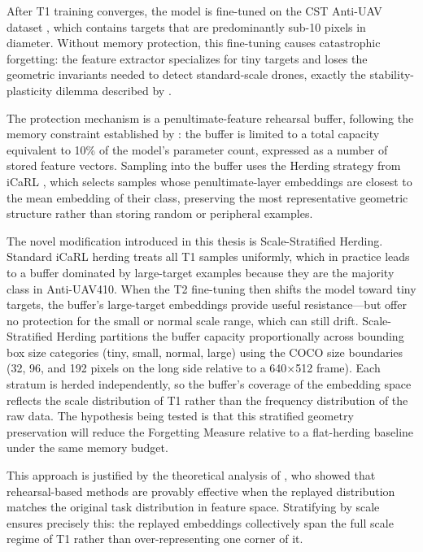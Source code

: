 \documentclass[nolinenumbering]{thesisdesign}
\begin{document}
After T1 training converges, the model is fine-tuned on the CST Anti-UAV dataset \citep{xie2025cstantiuavthermalinfrared}, which contains targets that are predominantly sub-10 pixels in diameter. Without memory protection, this fine-tuning causes catastrophic forgetting: the feature extractor specializes for tiny targets and loses the geometric invariants needed to detect standard-scale drones, exactly the stability-plasticity dilemma described by \citet{deng_unlocking_2025}.

The protection mechanism is a penultimate-feature rehearsal buffer, following the memory constraint established by \citet{chaudhry2019tiny}: the buffer is limited to a total capacity equivalent to 10\% of the model's parameter count, expressed as a number of stored feature vectors. Sampling into the buffer uses the Herding strategy from iCaRL \citep{rebuffi2017icarl}, which selects samples whose penultimate-layer embeddings are closest to the mean embedding of their class, preserving the most representative geometric structure rather than storing random or peripheral examples.

The novel modification introduced in this thesis is Scale-Stratified Herding. Standard iCaRL herding treats all T1 samples uniformly, which in practice leads to a buffer dominated by large-target examples because they are the majority class in Anti-UAV410. When the T2 fine-tuning then shifts the model toward tiny targets, the buffer's large-target embeddings provide useful resistance---but offer no protection for the small or normal scale range, which can still drift. Scale-Stratified Herding partitions the buffer capacity proportionally across bounding box size categories (tiny, small, normal, large) using the COCO size boundaries (32, 96, and 192 pixels on the long side relative to a 640$\times$512 frame). Each stratum is herded independently, so the buffer's coverage of the embedding space reflects the scale distribution of T1 rather than the frequency distribution of the raw data. The hypothesis being tested is that this stratified geometry preservation will reduce the Forgetting Measure relative to a flat-herding baseline under the same memory budget.

This approach is justified by the theoretical analysis of \citet{deng_unlocking_2025}, who showed that rehearsal-based methods are provably effective when the replayed distribution matches the original task distribution in feature space. Stratifying by scale ensures precisely this: the replayed embeddings collectively span the full scale regime of T1 rather than over-representing one corner of it.
\end{document}
